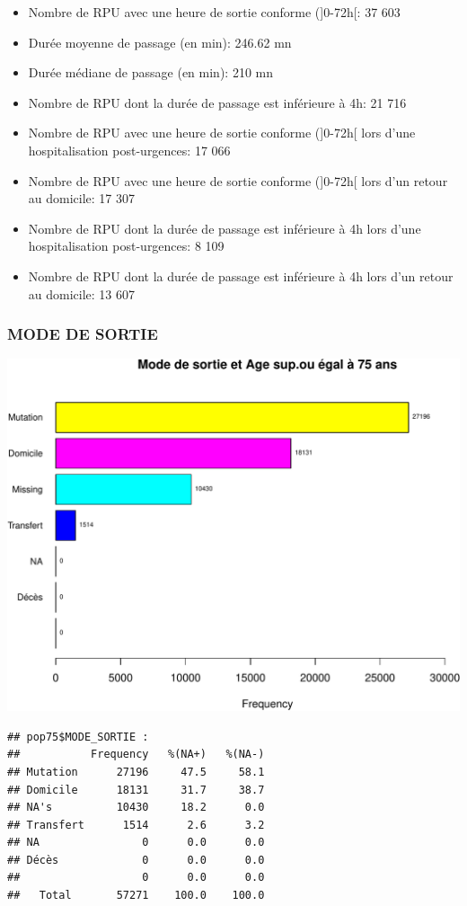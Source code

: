 \documentclass[]{article}
\begin{document}
\begin{itemize}
\item
  Nombre de RPU avec une heure de sortie conforme ({]}0-72h{[}: 37 603
\item
  Durée moyenne de passage (en min): 246.62 mn
\item
  Durée médiane de passage (en min): 210 mn
\item
  Nombre de RPU dont la durée de passage est inférieure à 4h: 21 716
\item
  Nombre de RPU avec une heure de sortie conforme ({]}0-72h{[} lors
  d'une hospitalisation post-urgences: 17 066
\item
  Nombre de RPU avec une heure de sortie conforme ({]}0-72h{[} lors d'un
  retour au domicile: 17 307
\item
  Nombre de RPU dont la durée de passage est inférieure à 4h lors d'une
  hospitalisation post-urgences: 8 109
\item
  Nombre de RPU dont la durée de passage est inférieure à 4h lors d'un
  retour au domicile: 13 607
\end{itemize}

\subsubsection{MODE DE SORTIE}\label{mode-de-sortie-1}

\includegraphics{rapport2014_V4_files/figure-latex/sortie75-1.pdf}

\begin{verbatim}
## pop75$MODE_SORTIE : 
##           Frequency   %(NA+)   %(NA-)
## Mutation      27196     47.5     58.1
## Domicile      18131     31.7     38.7
## NA's          10430     18.2      0.0
## Transfert      1514      2.6      3.2
## NA                0      0.0      0.0
## Décès             0      0.0      0.0
##                   0      0.0      0.0
##   Total       57271    100.0    100.0
\end{verbatim}
\end{document}
